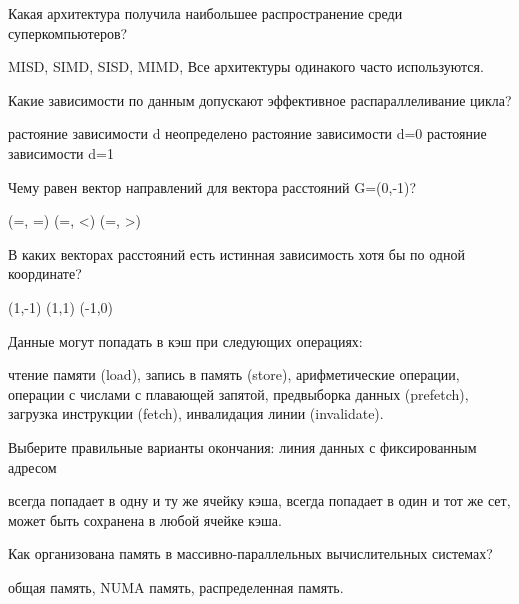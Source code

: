\documentclass[a4paper, 12pt, addpoints]{exam}
\begin{document}
\begin{questions}
\question[1] Какая архитектура получила наибольшее распространение среди суперкомпьютеров?
\begin{choices}
    \choice MISD,
    \choice SIMD,
    \choice SISD,
    \correctchoice MIMD,
    \choice Все архитектуры одинакого часто используются.
\end{choices}

\question[1] Какие зависимости по данным допускают эффективное распараллеливание цикла?
\begin{choices}
    \choice растояние зависимости d неопределено
    \correctchoice растояние зависимости d=0
    \choice растояние зависимости d=1
\end{choices}

\question[1] Чему равен вектор направлений для вектора расстояний G=(0,-1)?
\begin{choices}
    \choice (=, =)
    \choice (=, <)
    \correctchoice (=, >)
\end{choices}

\question[1] В каких векторах расстояний есть истинная зависимость хотя бы по одной координате?
\begin{choices}
    \correctchoice (1,-1)
    \correctchoice (1,1)
    \choice (-1,0)
\end{choices}

\question[1] Данные могут попадать в кэш при следующих операциях:
\begin{choices}
    \correctchoice чтение памяти (load),
    \correctchoice запись в память (store),
    \choice арифметические операции,
    \choice операции с числами с плавающей запятой,
    \correctchoice предвыборка данных (prefetch),
    \correctchoice загрузка инструкции (fetch),
    \choice инвалидация линии (invalidate).
\end{choices}

\question[1] Выберите правильные варианты окончания: линия данных с фиксированным адресом
\begin{choices}
    \choice всегда попадает в одну и ту же ячейку кэша,
    \correctchoice всегда попадает в один и тот же сет,
    \choice может быть сохранена в любой ячейке кэша.
\end{choices}

\question[1] Как организована память в массивно-параллельных вычислительных системах?
\begin{choices}
    \choice общая память,
    \choice NUMA память,
    \correctchoice распределенная память.
\end{choices}


\end{questions}
\end{document}
